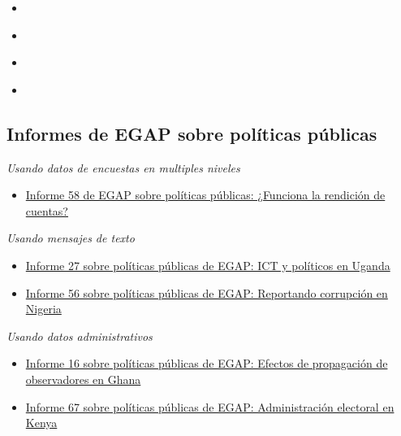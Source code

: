 \documentclass[12pt,spanish,]{book}
\providecommand{\tightlist}{%
  \setlength{\itemsep}{0pt}\setlength{\parskip}{0pt}}
\begin{document}
\begin{itemize}
\item
  \autocite{adcocoll:2001}
\item
  \autocite{scacco_can_2018}
\item
  \autocite{shadish2002experimental}
\item
  \autocite{vicente_is_2014}
\end{itemize}

\hypertarget{informes-de-egap-sobre-poluxedticas-puxfablicas-2}{%
\subsection{Informes de EGAP sobre políticas públicas}\label{informes-de-egap-sobre-poluxedticas-puxfablicas-2}}

\emph{Usando datos de encuestas en multiples niveles}

\begin{itemize}
\tightlist
\item
  \href{https://egap.org/resource/does-bottom-up-accountability-work-evidence-from-uganda/}{Informe 58 de EGAP sobre políticas públicas: ¿Funciona la rendición de cuentas?}
\end{itemize}

\emph{Usando mensajes de texto}

\begin{itemize}
\item
  \href{https://egap.org/resource/brief-27-ict-and-politicians-in-uganda/}{Informe 27 sobre políticas públicas de EGAP: ICT y políticos en Uganda}
\item
  \href{https://egap.org/resource/reporting-corruption-in-nigeria-testing-the-effects-of-norms-nudges/}{Informe 56 sobre políticas públicas de EGAP: Reportando corrupción en Nigeria}
\end{itemize}

\emph{Usando datos administrativos}

\begin{itemize}
\item
  \href{https://egap.org/resource/brief-16-spillover-effects-of-observers-in-ghana/}{Informe 16 sobre políticas públicas de EGAP: Efectos de propagación de observadores en Ghana}
\item
  \href{https://egap.org/resource/electoral-administration-in-kenya/}{Informe 67 sobre políticas públicas de EGAP: Administración electoral en Kenya}
\end{itemize}
\end{document}
